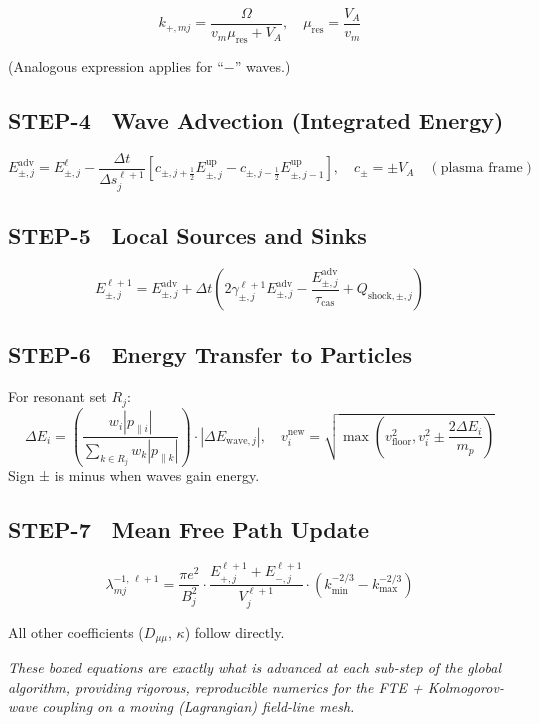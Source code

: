{\[
k_{+,mj} = \frac{\Omega}{v_m \mu_{\text{res}} + V_A},
\quad
\mu_{\text{res}} = \frac{V_A}{v_m}
\]

(Analogous expression applies for “$-$” waves.)

\subsection*{STEP-4 Wave Advection (Integrated Energy)}

\[
E_{\pm,j}^{\text{adv}} = E_{\pm,j}^{\ell}
- \frac{\Delta t}{\Delta s_j^{\ell+1}}
\left[c_{\pm,j+\frac{1}{2}} E_{\pm,j}^{\text{up}} - c_{\pm,j-\frac{1}{2}} E_{\pm,j-1}^{\text{up}} \right],
\quad
c_{\pm} = \pm V_A \quad (\text{plasma frame})
\]

\subsection*{STEP-5 Local Sources and Sinks}

\[
E_{\pm,j}^{\ell+1} = E_{\pm,j}^{\text{adv}} + \Delta t \left(
  2\gamma_{\pm,j}^{\ell+1} E_{\pm,j}^{\text{adv}}
  - \frac{E_{\pm,j}^{\text{adv}}}{\tau_{\text{cas}}}
  + Q_{\text{shock},\pm,j}
\right)
\]

\subsection*{STEP-6 Energy Transfer to Particles}

For resonant set $R_j$:
\[
\Delta E_i =
\left( \frac{w_i |p_{\parallel i}|}{\sum_{k \in R_j} w_k |p_{\parallel k}|} \right)
\cdot |\Delta E_{\text{wave},j}|,
\quad
v_i^{\text{new}} =
\sqrt{\max\left(v_{\text{floor}}^2, v_i^2 \pm \frac{2\Delta E_i}{m_p}\right)}
\]
Sign ± is minus when waves gain energy.

\subsection*{STEP-7 Mean Free Path Update}

\[
\lambda_{mj}^{-1,\,\ell+1}
= \frac{\pi e^2}{B_j^2}
\cdot \frac{E_{+,j}^{\ell+1} + E_{-,j}^{\ell+1}}{V_j^{\ell+1}}
\cdot \left(k_{\min}^{-2/3} - k_{\max}^{-2/3}\right)
\]

All other coefficients ($D_{\mu\mu}$, $\kappa$) follow directly.

\vspace{1em}
\noindent
\textit{These boxed equations are exactly what is advanced at each sub-step of the global algorithm, providing rigorous, reproducible numerics for the FTE + Kolmogorov-wave coupling on a moving (Lagrangian) field-line mesh.}

}
